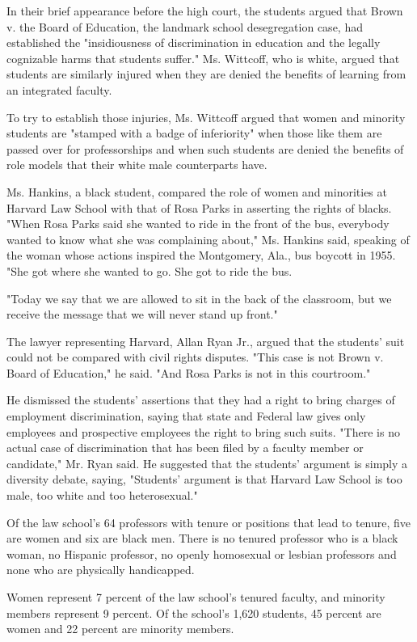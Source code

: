 In their brief appearance before the high court, the students argued
that Brown v. the Board of Education, the landmark school desegregation
case, had established the "insidiousness of discrimination in education
and the legally cognizable harms that students suffer." Ms. Wittcoff,
who is white, argued that students are similarly injured when they are
denied the benefits of learning from an integrated faculty.

To try to establish those injuries, Ms. Wittcoff argued that women and
minority students are "stamped with a badge of inferiority" when those
like them are passed over for professorships and when such students are
denied the benefits of role models that their white male counterparts
have.

Ms. Hankins, a black student, compared the role of women and minorities
at Harvard Law School with that of Rosa Parks in asserting the rights of
blacks. "When Rosa Parks said she wanted to ride in the front of the
bus, everybody wanted to know what she was complaining about," Ms.
Hankins said, speaking of the woman whose actions inspired the
Montgomery, Ala., bus boycott in 1955. "She got where she wanted to go.
She got to ride the bus.

"Today we say that we are allowed to sit in the back of the classroom,
but we receive the message that we will never stand up front."

The lawyer representing Harvard, Allan Ryan Jr., argued that the
students' suit could not be compared with civil rights disputes. "This
case is not Brown v. Board of Education," he said. "And Rosa Parks is
not in this courtroom."

He dismissed the students' assertions that they had a right to bring
charges of employment discrimination, saying that state and Federal law
gives only employees and prospective employees the right to bring such
suits. "There is no actual case of discrimination that has been filed by
a faculty member or candidate," Mr. Ryan said. He suggested that the
students' argument is simply a diversity debate, saying, "Students'
argument is that Harvard Law School is too male, too white and too
heterosexual."

Of the law school's 64 professors with tenure or positions that lead to
tenure, five are women and six are black men. There is no tenured
professor who is a black woman, no Hispanic professor, no openly
homosexual or lesbian professors and none who are physically
handicapped.

Women represent 7 percent of the law school's tenured faculty, and
minority members represent 9 percent. Of the school's 1,620 students, 45
percent are women and 22 percent are minority members.

